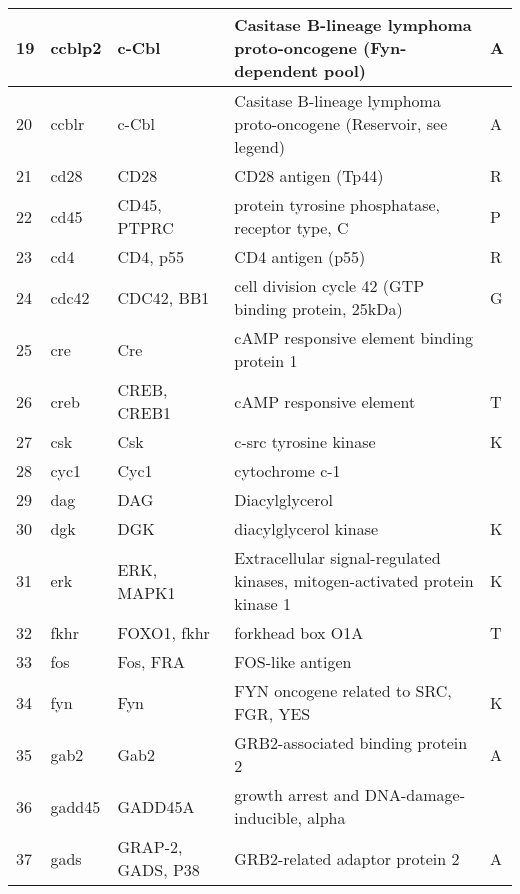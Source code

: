\documentclass[a4paper, 12pt,epsfig, onecolumn]{article}
\begin{document}
{\begin{longtable}{|p{}|p{}|p{}|p{}|p{}|}
\hline
        19 &  ccblp2    &      c-Cbl & Casitase B-lineage lymphoma proto-oncogene (Fyn-dependent pool) &         A  \\
\hline
        20 &   ccblr    &     c-Cbl  & Casitase B-lineage lymphoma proto-oncogene (Reservoir, see legend) &         A  \\
\hline
        21 &    cd28    &       CD28 & CD28 antigen (Tp44)    &         R  \\
\hline
        22 &  cd45      & CD45, PTPRC & protein tyrosine phosphatase, receptor type, C  &         P  \\
\hline
        23 &       cd4  &   CD4, p55 & CD4 antigen (p55)  &         R  \\
\hline
        24 &   cdc42    & CDC42, BB1 & cell division cycle 42 (GTP binding protein, 25kDa)    &         G  \\
\hline
        25 &    cre     &        Cre & cAMP responsive element binding protein 1  &            \\
\hline
        26 &  creb      & CREB, CREB1 & cAMP responsive element &         T  \\
\hline
        27 &      csk   &        Csk & c-src tyrosine kinase    &         K  \\
\hline
        28 &       cyc1 &       Cyc1 & cytochrome c-1    &            \\
\hline
        29 &    dag     &        DAG & Diacylglycerol &            \\
\hline
        30 &  dgk       &        DGK & diacylglycerol kinase &         K  \\
\hline
        31 &        erk & ERK, MAPK1 & Extracellular signal-regulated kinases, mitogen-activated protein kinase 1    &         K  \\
\hline
        32 &    fkhr    & FOXO1, fkhr & forkhead box O1A  &         T  \\
\hline
        33 &    fos     &   Fos, FRA & FOS-like antigen &            \\
\hline
        34 &       fyn  &        Fyn & FYN oncogene related to SRC, FGR, YES  &         K  \\
\hline
        35 &      gab2  &       Gab2 & GRB2-associated binding protein 2    &         A  \\
\hline
        36 &  gadd45    &    GADD45A & growth arrest and DNA-damage-inducible, alpha &            \\
\hline
        37 &    gads    & GRAP-2, GADS, P38 & GRB2-related adaptor protein 2   &         A  \\

\end{longtable}}
\end{document}
